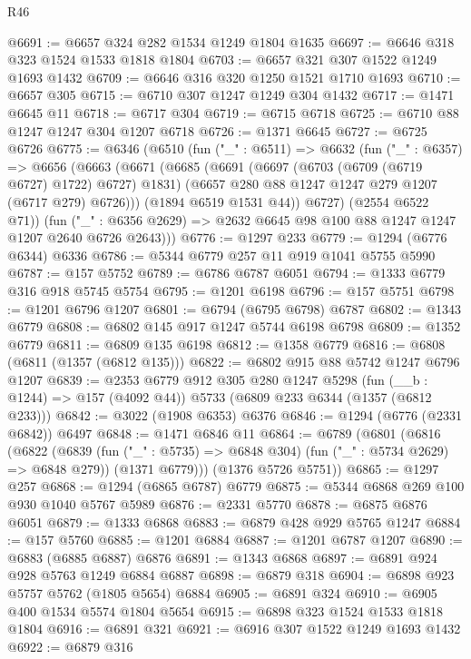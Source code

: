 \begin{lexlean}{R46}
\begin{coremodule}
@6691 := @6657 @324 @282 @1534 @1249 @1804 @1635
@6697 := @6646 @318 @323 @1524 @1533 @1818 @1804
@6703 := @6657 @321 @307 @1522 @1249 @1693 @1432
@6709 := @6646 @316 @320 @1250 @1521 @1710 @1693
@6710 := @6657 @305
@6715 := @6710 @307 @1247 @1249 @304 @1432
@6717 := @1471 @6645 @11
@6718 := @6717 @304
@6719 := @6715 @6718
@6725 := @6710 @88 @1247 @1247 @304 @1207 @6718
@6726 := @1371 @6645
@6727 := @6725 @6726
@6775 := @6346
    (@6510
      (fun ("_" : @6511) =>
      @6632
        (fun ("_" : @6357) =>
        @6656
          (@6663
            (@6671
              (@6685
                (@6691
                  (@6697 (@6703 (@6709 (@6719 @6727) @1722) @6727) @1831)
                  (@6657 @280 @88 @1247 @1247 @279 @1207 (@6717 @279) @6726)))
              (@1894 @6519 @1531 @44))
            @6727)
          (@2554 @6522 @71))
        (fun ("_" : @6356 @2629) => @2632 @6645 @98 @100 @88 @1247 @1247 @1207 @2640 @6726 @2643)))
@6776 := @1297 @233
@6779 := @1294 (@6776 @6344) @6336
@6786 := @5344 @6779 @257 @11 @919 @1041 @5755 @5990
@6787 := @157 @5752
@6789 := @6786 @6787 @6051
@6794 := @1333 @6779 @316 @918 @5745 @5754
@6795 := @1201 @6198
@6796 := @157 @5751
@6798 := @1201 @6796 @1207
@6801 := @6794 (@6795 @6798) @6787
@6802 := @1343 @6779
@6808 := @6802 @145 @917 @1247 @5744 @6198 @6798
@6809 := @1352 @6779
@6811 := @6809 @135 @6198
@6812 := @1358 @6779
@6816 := @6808 (@6811 (@1357 (@6812 @135)))
@6822 := @6802 @915 @88 @5742 @1247 @6796 @1207
@6839 := @2353
    @6779
    @912
    @305
    @280
    @1247
    @5298
    (fun (__b : @1244) => @157 (@4092 @44))
    @5733
    (@6809 @233 @6344 (@1357 (@6812 @233)))
@6842 := @3022 (@1908 @6353) @6376
@6846 := @1294 (@6776 (@2331 @6842)) @6497
@6848 := @1471 @6846 @11
@6864 := @6789
    (@6801
      (@6816
        (@6822
          (@6839 (fun ("_" : @5735) => @6848 @304) (fun ("_" : @5734 @2629) => @6848 @279))
          (@1371 @6779)))
      (@1376 @5726 @5751))
@6865 := @1297 @257
@6868 := @1294 (@6865 @6787) @6779
@6875 := @5344 @6868 @269 @100 @930 @1040 @5767 @5989
@6876 := @2331 @5770
@6878 := @6875 @6876 @6051
@6879 := @1333 @6868
@6883 := @6879 @428 @929 @5765 @1247
@6884 := @157 @5760
@6885 := @1201 @6884
@6887 := @1201 @6787 @1207
@6890 := @6883 (@6885 @6887) @6876
@6891 := @1343 @6868
@6897 := @6891 @924 @928 @5763 @1249 @6884 @6887
@6898 := @6879 @318
@6904 := @6898 @923 @5757 @5762 (@1805 @5654) @6884
@6905 := @6891 @324
@6910 := @6905 @400 @1534 @5574 @1804 @5654
@6915 := @6898 @323 @1524 @1533 @1818 @1804
@6916 := @6891 @321
@6921 := @6916 @307 @1522 @1249 @1693 @1432
@6922 := @6879 @316

\end{coremodule}
\end{lexlean}
